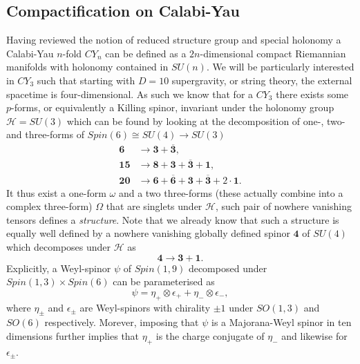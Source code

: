 \subsection{Compactification on Calabi-Yau}\label{sec:CalabiYau}
Having reviewed the notion of reduced structure group and special holonomy a Calabi-Yau $n$-fold $CY_{n}$ can be defined as a $2n$-dimensional compact Riemannian manifolds with holonomy contained in $SU(n)$\cite{Blumenhagen2013}. We will be particularly interested in $CY_3$ such that starting with $D=10$ supergravity, or string theory, the external spacetime is four-dimensional. As such we know that for a $CY_3$ there exists some $p$-forms, or equivalently a Killing spinor, invariant under the holonomy group $\mathscr{H}=SU(3)$ which can be found by looking at the decomposition of one-, two- and three-forms of $Spin(6)\cong SU(4)\to SU(3)$
\begin{align*}
    \mathbf{6}&\to \mathbf{3}+\mathbf{\overbar{3}},\\
    \mathbf{15}&\to \mathbf{8}+\mathbf{3}+\overbar{\mathbf{3}}+\mathbf{1},\\
    \mathbf{20}&\to \mathbf{6}+\overbar{\mathbf{6}}+\mathbf{3}+\overbar{\mathbf{3}}+2\cdot\mathbf{1}.
\end{align*}
It thus exist a one-form $\omega$ and a two three-forms (these actually combine into a complex three-form) $\Omega$ that are singlets under $\mathscr{H}$, such pair of nowhere vanishing tensors defines a \emph{structure}. Note that we already know that such a structure is equally well defined by a nowhere vanishing globally defined spinor $\mathbf{4}$ of $SU(4)$ which decomposes under $\mathscr{H}$ as 
\begin{equation}
    \mathbf{4}\to \mathbf{3}+\mathbf{1}.
\end{equation}
Explicitly, a Weyl-spinor $\psi$ of $Spin(1,9)$ decomposed under $Spin(1,3)\times Spin(6)$ can be parameterised as 
\begin{equation}
    \psi = \eta_+\otimes\epsilon_++\eta_-\otimes\epsilon_-,
\end{equation}
where $\eta_\pm$ and $\epsilon_\pm$ are Weyl-spinors with chirality $\pm 1$ under $SO(1,3)$ and $SO(6)$ respectively. Morever, imposing that $\psi$ is a Majorana-Weyl spinor in ten dimensions further implies that $\eta_+$ is the charge conjugate of $\eta_-$ and likewise for $\epsilon_\pm$.

